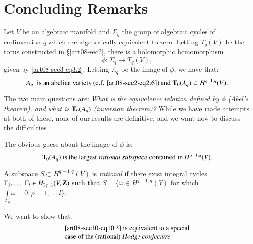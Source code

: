 \section{Concluding Remarks}\label{art08-sec10}

Let $V$ be an algebraic manifold and $\Sigma_{q}$ the group of algebraic cycles of codimension $q$ which are algebraically equivalent to zero. Letting $T_{q}(V)$ be the torus constructed in \S\ref{art08-sec2}, there is a holomorphic homomorphism
\setcounter{equation}{0}
\begin{equation}
\phi : \Sigma_{q}\to T_{q}(V),\label{art08-sec10-eq10.1}
\end{equation}
given by \eqref{art08-sec3-eq3.2}. Letting $A_{q}$ be the image of $\phi$, we have that:
\begin{equation}
A_{q}\text{~ is an abelian variety (c.f. \eqref{art08-sec2-eq2.6}) and } \mathbf{T}_{0}(A_{q})\subset H^{q-1,q}(V).\label{art08-sec10-eq10.2}
\end{equation}

The two main questions are: {\em What is the equivalence relation defined by $\phi$ (Abel's theorem), and what is $\mathbf{T}_{0}(A_{q})$ (inversion theorem)?} While we have made attempts at both of these, none of our results are definitive, and we want now to discuss the difficulties.

The obvious guess about the image of $\phi$ is:
\begin{equation}
\mathbf{T}_{0}(A_{q})\text{ is the largest {\em rational subspace} contained in } H^{q-1,q}(V).\label{art08-sec10-eq10.3}
\end{equation}

\begin{remark*}
A subspace $S\subset H^{q-1,q}(V)$ is {\em rational} if there exist integral cycles $\Gamma_{1},\ldots,\Gamma_{l}\in H_{2q-1}(V,\mathbf{Z})$ such that $S=\{\omega\in H^{q-1,q}(V)$ for which $\int\limits_{\Gamma_{\rho}}\omega=0,\rho=1,\ldots,l\}$.
\end{remark*}

We want to show that:
\begin{equation}
\begin{array}{l}
\text{\eqref{art08-sec10-eq10.3} is equivalent to a special}\\
\text{case of the (rational) {\em Hodge conjecture.}}
\end{array}\label{art08-sec10-eq10.4}
\end{equation}

